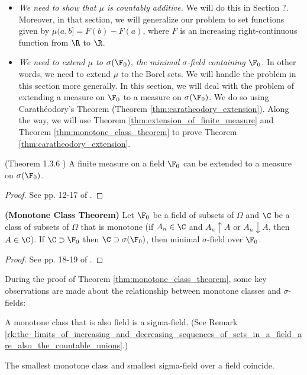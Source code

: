 \documentclass{article} %
\begin{document}
\begin{itemize}
\item \textit{We need to show that $\mu$ is countably additive.} We will do this in Section ?.   Moreover, in that section, we will generalize our problem to set functions given by $\mu(a,b] = F(b)-F(a)$, where $F$ is an increasing right-continuous function from $\R$ to $\R$.
\item \textit{We need to extend $\mu$ to $\sigma(\F_0)$, the minimal $\sigma$-field containing $\F_0$.} In other words, we need to extend $\mu$ to the Borel sets.  We will handle the problem in this section more generally.  In this section, we will deal with the problem of extending a measure on $\F_0$ to a measure on $\sigma(\F_0)$. We do so using Carath\'eodory's Theorem  (Theorem \ref{thm:caratheodory_extension}).  Along the way, we will use Theorem \ref{thm:extension_of_finite_measure} and Theorem \ref{thm:monotone_class_theorem} to prove Theorem \ref{thm:caratheodory_extension}. 
\end{itemize}

 \begin{theorem}
 (Theorem 1.3.6 \cite{ash2000probability}) A finite measure on a field $\F_0$ can be extended to a measure on $\sigma(\F_0)$. 	
 \label{thm:extension_of_finite_measure}
 \end{theorem}

\begin{proof}
See pp. 12-17 of \cite{ash2000probability}.	
\end{proof}

\begin{theorem}{\textbf{(Monotone Class Theorem)}}
Let $\F_0$ be a field of subsets of $\Omega$ and $\C$ be a class of subsets of $\Omega$ that is monotone (if $A_n \in \C$ and $A_n \uparrow 
A$ or $A_n \downarrow A$, then $A \in \C$).  If $\C \supset \F_0$ then $\C \supset \sigma(\F_0)$, then minimal $\sigma$-field over $\F_0$. 
 \label{thm:monotone_class_theorem}
\end{theorem}

\begin{proof}
See pp. 18-19 of \cite{ash2000probability}.	
\end{proof}

\begin{remark}
During the proof of Theorem \ref{thm:monotone_class_theorem}, some key observations are made about the relationship between monotone classes and $\sigma$-fields:
\begin{alphabate}
\item A monotone class that is also field is a sigma-field.  (See Remark \ref{rk:the_limits_of_increasing_and_decreasing_sequences_of_sets_in_a_field_are_also_the_countable_unions}.)
\item The smallest monotone class and smallest sigma-field over a field coincide. 
\end{alphabate}
\label{rk:monotone_classes_and_sigma_fields}
\end{remark}
\end{document}
